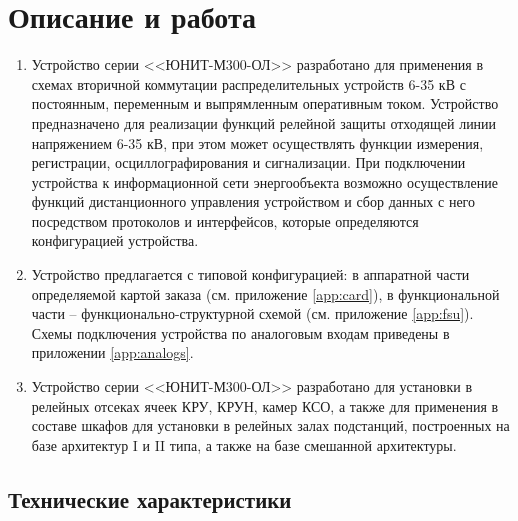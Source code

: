 \color{unimain}\section[Описание и работа]{Описание и работа}
\color{black}

\color{black}

\begin{enumerate}

\item
Устройство серии <<ЮНИТ-М300-ОЛ>> разработано для применения в схемах вторичной коммутации распределительных устройств 6-35 кВ с постоянным, переменным и выпрямленным оперативным током. Устройство предназначено для реализации функций релейной защиты отходящей линии напряжением 6-35 кВ, при этом может осуществлять функции измерения, регистрации, осциллографирования и сигнализации. При подключении устройства к информационной сети энергообъекта возможно осуществление функций дистанционного управления устройством и сбор данных с него посредством протоколов и интерфейсов, которые определяются конфигурацией устройства.
\item 
Устройство предлагается с типовой конфигурацией: в аппаратной части определяемой картой заказа (см. приложение \ref{app:card}), в функциональной части -- функционально-структурной схемой (см. приложение \ref{app:fsu}). Схемы подключения устройства по аналоговым входам приведены в приложении \ref{app:analogs}.
\item
Устройство серии <<ЮНИТ-М300-ОЛ>> разработано для установки в релейных отсеках ячеек КРУ, КРУН, камер КСО, а также для применения в составе шкафов для установки в релейных залах подстанций, построенных на базе архитектур I и II типа, а также на базе смешанной архитектуры.

\end{enumerate}


\color{unimain}\subsection{Технические характеристики}
\color{black}

